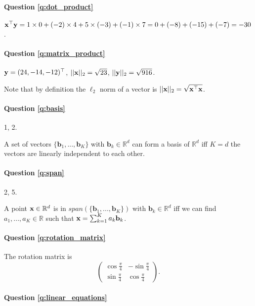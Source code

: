 \paragraph{Question \ref{q:dot_product}}
$\mathbf{x}^\top \mathbf{y} = 1 \times 0 + (-2) \times 4 + 5 \times (-3) + (-1) \times 7 = 0 + (-8) + (-15) + (-7) = -30$.

\paragraph{Question \ref{q:matrix_product}}
$\mathbf{y} = (24, -14, -12)^\top$, $|| \mathbf{x} ||_2 = \sqrt{23}$, $|| \mathbf{y} ||_2 = \sqrt{916}$.

Note that by definition the $\ell_2$ norm of a vector is $|| \mathbf{x} ||_2 = \sqrt{\mathbf{x}^\top \mathbf{x}}$.

\paragraph{Question \ref{q:basis}} 1, 2. 

A set of vectors $\{\mathbf{b}_1, ..., \mathbf{b}_K \}$ with $\mathbf{b}_k \in \mathbb{R}^d$ can form a basis of $\mathbb{R}^d$ iff $K = d$ the vectors are linearly independent to each other.

\paragraph{Question \ref{q:span}} 2, 5. 

A point $\mathbf{x} \in \mathbb{R}^d$ is in $span(\{\mathbf{b}_1, ..., \mathbf{b}_K \})$ with $\mathbf{b}_k \in \mathbb{R}^d$ iff we can find $a_1, ..., a_K \in \mathbb{R}$ such that $\mathbf{x} = \sum_{k=1}^K a_k \mathbf{b}_k$.

\paragraph{Question \ref{q:rotation_matrix}} The rotation matrix is 
\begin{equation*}
    \begin{pmatrix}
    \cos{\frac{\pi}{4}} & -\sin{\frac{\pi}{4}} \\
    \sin{\frac{\pi}{4}} & \cos{\frac{\pi}{4}}
    \end{pmatrix}.
\end{equation*}

\paragraph{Question \ref{q:linear_equations}}

